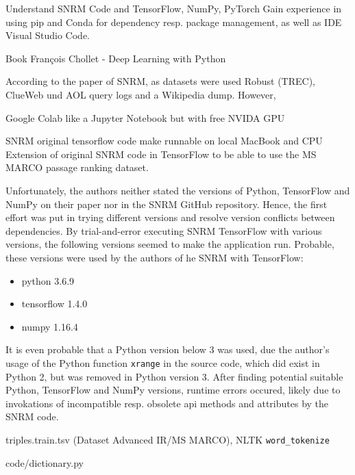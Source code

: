 Understand SNRM Code and TensorFlow, NumPy, PyTorch
Gain experience in using pip and Conda for dependency resp. package management, as well as IDE Visual Studio Code.


Book François Chollet - Deep Learning with Python

According to the paper of SNRM, as datasets were used Robust (TREC), ClueWeb und AOL query logs and a Wikipedia dump.
However, 



Google Colab like a Jupyter Notebook but with free NVIDA GPU

SNRM original tensorflow code make runnable on local MacBook and CPU
Extension of original SNRM code in TensorFlow to be able to use the MS MARCO passage ranking dataset.

Unfortunately, the authors neither stated the versions of Python, TensorFlow and NumPy on their paper nor in the SNRM GitHub repository.
Hence, the first effort was put in trying different versions and resolve version conflicts between dependencies.
By trial-and-error executing SNRM TensorFlow with various versions, the following versions seemed to make the application run.
Probable, these versions were used by the authors of he SNRM with TensorFlow:

\begin{itemize}
    \item python 3.6.9
    \item tensorflow 1.4.0
    \item numpy 1.16.4
\end{itemize}

It is even probable that a Python version below 3 was used, due the author's usage of the Python 
    function \texttt{xrange} in the source code, which did exist in Python 2, but was removed in Python version 3.
After finding potential suitable Python, TensorFlow and NumPy versions, runtime errors occured, likely due to invokations of incompatible 
    resp. obsolete api methods and attributes by the SNRM code.



triples.train.tsv (Dataset Advanced IR/MS MARCO), NLTK \verb|word_tokenize|




code/dictionary.py




